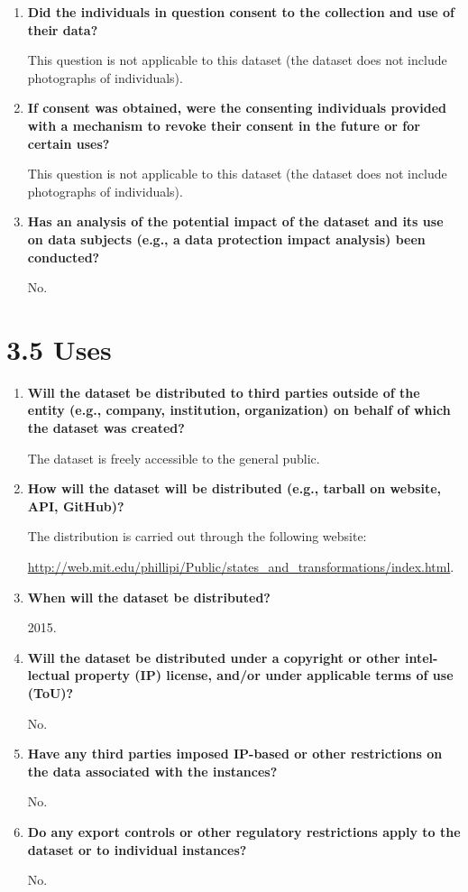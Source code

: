 \documentclass[a4paper,12pt]{article}
\begin{document}
\begin{enumerate}
    \item \textbf{Did the individuals in question consent to the collection and use
    of their data?}

    This question is not applicable to this dataset (the dataset does not include photographs of individuals).

    \item \textbf{If consent was obtained, were the consenting individuals provided with a mechanism to revoke their consent in the future or for certain uses?}
    
    This question is not applicable to this dataset (the dataset does not include photographs of individuals).

    \item \textbf{Has an analysis of the potential impact of the dataset and its use
    on data subjects (e.g., a data protection impact analysis) been conducted?}

    No.

\end{enumerate}



\section*{3.5 Uses}

\begin{enumerate}
    \item \textbf{Will the dataset be distributed to third parties outside of the entity (e.g., company, institution, organization) on behalf of which
    the dataset was created?}

    The dataset is freely accessible to the general public.

    \item \textbf{How will the dataset will be distributed (e.g., tarball on website,
    API, GitHub)? }

    The distribution is carried out through the following website: 
    
    \url{http://web.mit.edu/phillipi/Public/states_and_transformations/index.html}.

    \item \textbf{When will the dataset be distributed?}
    
    2015.

    \item \textbf{Will the dataset be distributed under a copyright or other intel-
    lectual property (IP) license, and/or under applicable terms of use
    (ToU)?}

    No.

    \item \textbf{Have any third parties imposed IP-based or other restrictions on
    the data associated with the instances?}

    No.

    \item \textbf{Do any export controls or other regulatory restrictions apply to
    the dataset or to individual instances?}

    No.

\end{enumerate}
\end{document}
